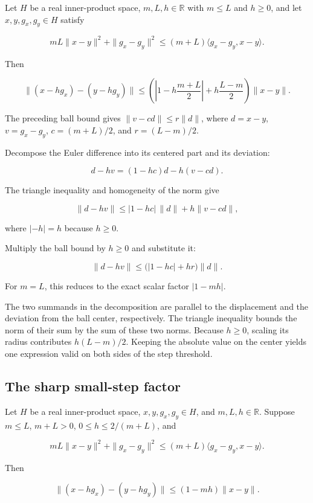 \documentclass[11pt,a4paper]{report}
\begin{document}
Let \(H\) be a real inner-product space, \(m,L,h\in\mathbb R\) with \(m\le L\) and \(h\ge0\), and let \(x,y,g_x,g_y\in H\) satisfy

\[mL\|x-y\|^2+\|g_x-g_y\|^2\le(m+L)\langle g_x-g_y,x-y\rangle.\]

Then

\[\|(x-hg_x)-(y-hg_y)\|\le\left(\left|1-h\frac{m+L}{2}\right|+h\frac{L-m}{2}\right)\|x-y\|.\]

The preceding ball bound gives \(\|v-cd\|\le r\|d\|\), where \(d=x-y\), \(v=g_x-g_y\), \(c=(m+L)/2\), and \(r=(L-m)/2\).



Decompose the Euler difference into its centered part and its deviation:

\[d-hv=(1-hc)d-h(v-cd).\]

The triangle inequality and homogeneity of the norm give

\[\|d-hv\|\le|1-hc|\,\|d\|+h\|v-cd\|,\]

where \(|-h|=h\) because \(h\ge0\).



Multiply the ball bound by \(h\ge0\) and substitute it:

\[\|d-hv\|\le\bigl(|1-hc|+hr\bigr)\|d\|.\]

For \(m=L\), this reduces to the exact scalar factor \(|1-mh|\).



The two summands in the decomposition are parallel to the displacement and the deviation from the ball center, respectively. The triangle inequality bounds the norm of their sum by the sum of these two norms. Because \(h\ge0\), scaling its radius contributes \(h(L-m)/2\). Keeping the absolute value on the center yields one expression valid on both sides of the step threshold.

\subsection{\texorpdfstring{The sharp small-step factor}{The sharp small-step factor}}
\label{report-step-UnadjustedLangevin-SharpContraction-lean-5}


Let \(H\) be a real inner-product space, \(x,y,g_x,g_y\in H\), and \(m,L,h\in\mathbb R\). Suppose \(m\le L\), \(m+L>0\), \(0\le h\le2/(m+L)\), and

\[mL\|x-y\|^2+\|g_x-g_y\|^2\le(m+L)\langle g_x-g_y,x-y\rangle.\]

Then

\[\|(x-hg_x)-(y-hg_y)\|\le(1-mh)\|x-y\|.\]
\end{document}
